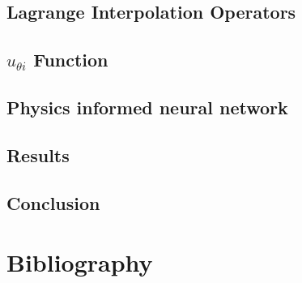 \documentclass{beamer}
\begin{document}
\subsection{Lagrange Interpolation Operators}

\subsection{$u_{\theta i}$ Function}


\subsection{Physics informed neural network}





\subsection{Results}










\subsection{Conclusion}



\section{Bibliography}

\end{document}
